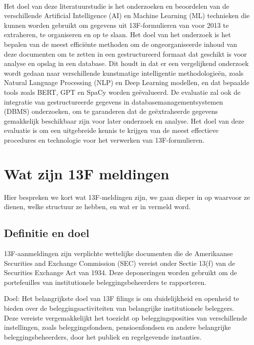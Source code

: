\\
Het doel van deze literatuurstudie is het onderzoeken en beoordelen van de verschillende Artificial Intelligence (AI) en Machine Learning (ML) technieken die kunnen worden gebruikt om gegevens uit 13F-formulieren van voor 2013 te extraheren, te organiseren en op te slaan. Het doel van het onderzoek is het bepalen van de meest efficiënte methoden om de ongeorganiseerde inhoud van deze documenten om te zetten in een gestructureerd formaat dat geschikt is voor analyse en opslag in een database. Dit houdt in dat er een vergelijkend onderzoek wordt gedaan naar verschillende kunstmatige intelligentie methodologieën, zoals Natural Language Processing (NLP) en Deep Learning modellen, en dat bepaalde tools zoals BERT, GPT en SpaCy worden geëvalueerd. De evaluatie zal ook de integratie van gestructureerde gegevens in databasemanagementsystemen (DBMS) onderzoeken, om te garanderen dat de geëxtraheerde gegevens gemakkelijk beschikbaar zijn voor later onderzoek en analyse. Het doel van deze evaluatie is om een uitgebreide kennis te krijgen van de meest effectieve procedures en technologie voor het verwerken van 13F-formulieren. 

\section{Wat zijn 13F meldingen}


Hier bespreken we kort wat 13F-meldingen zijn, we gaan dieper in op waarvoor ze dienen, welke structuur ze hebben, en wat er in vermeld word.
\subsection{Definitie en doel}
13F-aanmeldingen zijn verplichte wettelijke documenten die de Amerikaanse Securities and Exchange Commission (SEC) vereist onder Sectie 13(f) van de Securities Exchange Act van 1934. Deze deponeringen worden gebruikt om de portefeuilles van institutionele beleggingsbeheerders te rapporteren.

Doel: Het belangrijkste doel van 13F filings is om duidelijkheid en openheid te bieden over de beleggingsactiviteiten van belangrijke institutionele beleggers. Deze vereiste vergemakkelijkt het toezicht op beleggingsposities van verschillende instellingen, zoals beleggingsfondsen, pensioenfondsen en andere belangrijke beleggingsbeheerders, door het publiek en regelgevende instanties.


